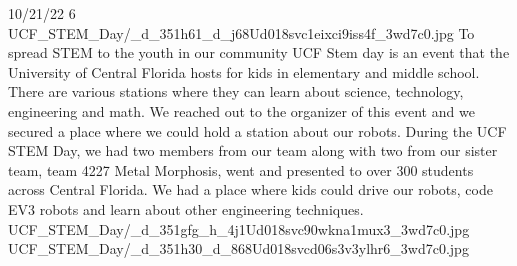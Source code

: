 {10/21/22}
{6}
{UCF_STEM_Day/_d_351h61_d_j68Ud018svc1eixci9iss4f_3wd7c0.jpg}
{To spread STEM to the youth in our community}
{UCF Stem day is an event that the University of Central Florida hosts for kids in elementary and middle school. There are various stations where they can learn about science, technology, engineering and math. We reached out to the organizer of this event and we secured a place where we could hold a station about our robots. During the UCF STEM Day, we had two members from our team along with two from our sister team, team 4227 Metal Morphosis, went and presented to over 300 students across Central Florida. We had a place where kids could drive our robots, code EV3 robots and learn about other engineering techniques. 
} 
{UCF_STEM_Day/_d_351gfg_h_4j1Ud018svc90wkna1mux3_3wd7c0.jpg}
{UCF_STEM_Day/_d_351h30_d_868Ud018svcd06s3v3ylhr6_3wd7c0.jpg}
